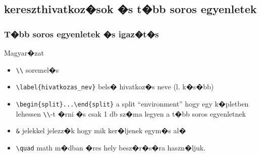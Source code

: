 \documentclass[xcolor=pdftex,dvipsnames,table,compress,bigger]{beamer}
\makeatletter
\newenvironment{eqxample}{%
  \par\addvspace\medskipamount
  \noindent\begin{minipage}{.5\columnwidth}%
  \def\producing{\end{minipage}\begin{minipage}{.5\columnwidth}%
    \hbox\bgroup\kern-.2pt\vrule width.2pt%
      \vbox\bgroup\parindent0pt\relax
    \abovedisplayskip3pt \abovedisplayshortskip\abovedisplayskip
    \belowdisplayskip0pt \belowdisplayshortskip\belowdisplayskip
    \noindent}
}{%
  \par
  \hrule height0pt width\hsize
  \egroup\vrule width.2pt\kern-.2pt\egroup
  \end{minipage}%
  \par\addvspace\medskipamount
}
\makeatother
\begin{document}
\subsection{kereszthivatkoz�sok �s t�bb soros egyenletek}
\begin{frame}[fragile]
    \frametitle{T�bb soros egyenletek �s igaz�t�s}

\begin{block}{Magyar�zat}
\begin{itemize}[<alert@+>]
\item \verb*|\\| soremel�s
\item \verb*|\label{hivatkozas_nev}| bels� hivatkoz�s neve (l. k�s�bb)
\item \verb*|\begin{split}...\end{split}| a split ``environment'' hogy egy k�pletben lehessen \verb*|\\|-t �rni �s csak 1 db sz�ma legyen a t�bb soros egyenletnek
\item \verb*|&| jelekkel jelezz�k hogy mik ker�ljenek egym�s al�
\item \verb*|\quad| math m�dban �res hely besz�r�s�ra haszn�ljuk.
\end{itemize}
\end{block}
    
\end{frame}
\end{document}
